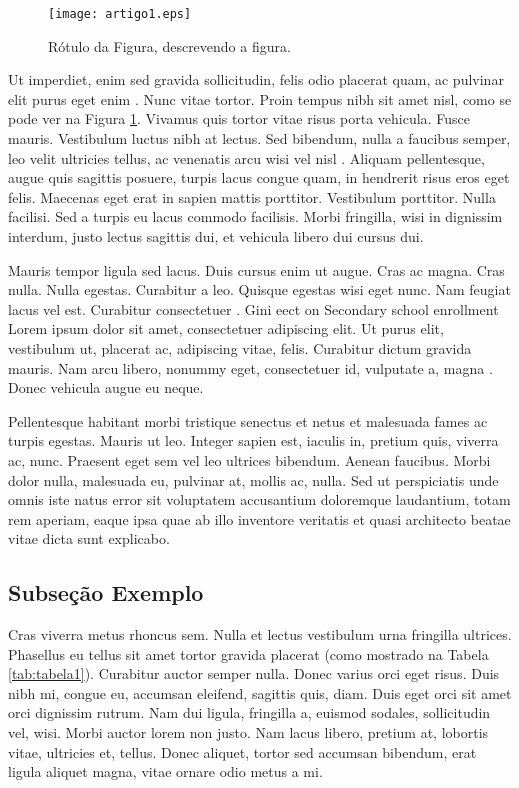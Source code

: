 \begin{figure}[!ht]
	\centering
	\texttt{[image: artigo1.eps]}   
	\caption{Rótulo da Figura, descrevendo a figura.}
	\label{fig:figura1}
\end{figure}

Ut imperdiet, enim sed gravida sollicitudin, felis odio placerat quam, ac pulvinar elit purus eget enim \citep{Gubitoso1992}. Nunc vitae tortor. Proin tempus nibh sit amet nisl, como se pode ver na Figura \ref{fig:figura1}. Vivamus quis tortor vitae risus porta vehicula. Fusce mauris. Vestibulum luctus nibh at lectus. Sed bibendum, nulla a faucibus semper, leo velit ultricies tellus, ac venenatis arcu wisi vel nisl \citep{icse2015}. Aliquam pellentesque, augue quis sagittis posuere, turpis lacus congue quam, in hendrerit risus eros eget felis. Maecenas eget erat in sapien mattis porttitor\footnotemark. Vestibulum porttitor. Nulla facilisi. Sed a turpis eu lacus commodo facilisis. Morbi fringilla, wisi in dignissim interdum, justo lectus sagittis dui, et vehicula libero dui cursus dui.


Mauris tempor ligula sed lacus. Duis cursus enim ut augue. Cras ac magna. Cras nulla. Nulla egestas. Curabitur a leo. Quisque egestas wisi eget nunc. Nam feugiat lacus vel est. Curabitur consectetuer \citep{Araujo2015}. Gini eect on Secondary school enrollment Lorem ipsum dolor sit amet, consectetuer adipiscing elit. Ut purus elit, vestibulum ut, placerat ac, adipiscing vitae, felis. Curabitur dictum gravida mauris. Nam arcu libero, nonummy eget, consectetuer id, vulputate a, magna \citep{Folha2015}. Donec vehicula augue eu neque.

Pellentesque habitant morbi tristique senectus et netus et malesuada fames ac turpis egestas. Mauris ut leo. Integer sapien est, iaculis in, pretium quis, viverra ac, nunc. Praesent eget sem vel leo ultrices bibendum. Aenean faucibus. Morbi dolor nulla, malesuada eu, pulvinar at, mollis ac, nulla. Sed ut perspiciatis unde omnis iste natus error sit voluptatem accusantium doloremque laudantium, totam rem aperiam, eaque ipsa quae ab illo inventore veritatis et quasi architecto beatae vitae dicta sunt explicabo.

\subsection{Subseção Exemplo}
Cras viverra metus rhoncus sem. Nulla et lectus vestibulum urna fringilla ultrices. Phasellus eu tellus sit amet tortor gravida placerat (como mostrado na Tabela \ref{tab:tabela1}). Curabitur auctor semper nulla. Donec varius orci eget risus. Duis nibh mi, congue eu, accumsan eleifend, sagittis quis, diam. Duis eget orci sit amet orci dignissim rutrum. Nam dui ligula, fringilla a, euismod sodales, sollicitudin vel, wisi. Morbi auctor lorem non justo. Nam lacus libero, pretium at, lobortis vitae, ultricies et, tellus. Donec aliquet, tortor sed accumsan bibendum, erat ligula aliquet magna, vitae ornare odio metus a mi.

